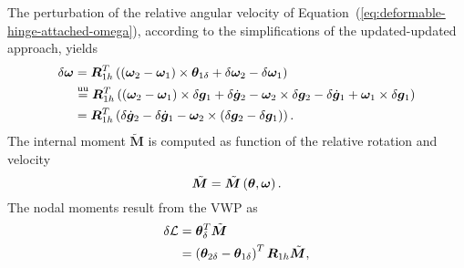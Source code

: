 \documentclass[10pt,dvips,fleqn,subeqn]{report}
\newcommand{\T}[1]{\bm{#1}}
\newcommand{\TT}[1]{\bm{#1}}
\newcommand{\equu}{\overset{\text{uu}}{=}}
\begin{document}
\begin{comment}
The relative angular velocity stems from the time derivative
of $\TT{R}_{1h}^T\TT{R}_{2h}$
\begin{equation}
	\T{\omega} = \T{R}_{1h}^T\plbr{\T{\omega}_2 - \T{\omega}_1} ;
	\label{eq:deformable-hinge-attached-omega}
\end{equation}
in fact, the time derivative of the relative orientation yields
\begin{align}
	\T{\omega} \times{}
	&= \frac{\mathrm{d}}{\mathrm{d}t}\plbr{\T{R}_{1h}^T \T{R}_{2h}}\plbr{\T{R}_{1h}^T \T{R}_{2h}}^T \nonumber \\
	&= \plbr{\dot{\T{R}}_{1h}^T \T{R}_{2h} + \T{R}_{1h}^T \dot{\T{R}}_{2h}} \T{R}_{2h}^T \T{R}_{1h} \nonumber \\
	&= \T{R}_{1h}^T \T{\omega}_1 \times{}^T \T{R}_{1h} + \T{R}_{1h}^T \T{\omega}_2 \times \T{R}_{1h} \nonumber \\
	&= \T{R}_{1h}^T \plbr{\T{\omega}_2 - \T{\omega}_1} \times \T{R}_{1h}
\end{align}
\end{comment}
The perturbation of the relative angular velocity
of Equation~(\ref{eq:deformable-hinge-attached-omega}),
according to the simplifications of the updated-updated approach, yields
\begin{align}
	\delta\T{\omega} &= \T{R}_{1h}^T\plbr{
		\plbr{\T{\omega}_2 - \T{\omega}_1} \times \T{\theta}_{1\delta}
		+ \delta\T{\omega}_2
		- \delta\T{\omega}_1
	} \nonumber \\
	&\equu \T{R}_{1h}^T\plbr{
		\plbr{\T{\omega}_2 - \T{\omega}_1} \times \delta\T{g}_1
		+ \delta\dot{\T{g}}_2 - \T{\omega}_2 \times \delta\T{g}_2
		- \delta\dot{\T{g}}_1 + \T{\omega}_1 \times \delta\T{g}_1
	} \nonumber \\
	&= \T{R}_{1h}^T\plbr{
		\delta\dot{\T{g}}_2
		- \delta\dot{\T{g}}_1
		- \T{\omega}_2 \times \plbr{\delta\T{g}_2 - \delta\T{g}_1}
	} .
\end{align}
The internal moment $\tilde{\T{M}}$ is computed as function
of the relative rotation and velocity
\begin{equation}
	\tilde{\T{M}} = \tilde{\T{M}}\plbr{\T{\theta}, \T{\omega}} .
\end{equation}
The nodal moments result from the VWP as
\begin{align}
	\delta\mathcal{L} &= \T{\theta}_{\delta}^T \tilde{\T{M}} \nonumber \\
	&= \plbr{
		\T{\theta}_{2\delta} - \T{\theta}_{1\delta}
	}^T \T{R}_{1h} \tilde{\T{M}} ,
\end{align}
\end{document}

